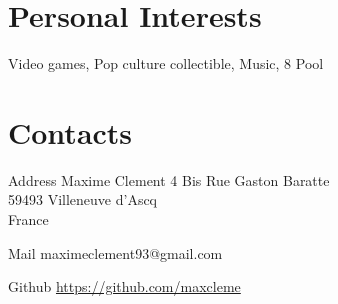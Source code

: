 \documentclass[hidelinks]{cv-style}          %
\begin{document}
\section{Personal Interests}
\begin{entrylist}
\entry
{Video games, Pop culture collectible, Music, 8 Pool}
{}
{}
{\vspace{-0.3cm}}	
\end{entrylist}
\leavevmode\newline


\section{Contacts}

\begin{entrylist}
\entry
  {Address}
  {Maxime Clement}
  {}
  {
  4 Bis Rue Gaston Baratte\\
59493 Villeneuve d'Ascq\\ 
France\\
}

\entry
  {Mail}
  {maximeclement93@gmail.com}
  {}
  {}
  
\entry
  {Github}
  {\url{https://github.com/maxcleme}}
  {}
  {}
\end{entrylist}
\end{document}
